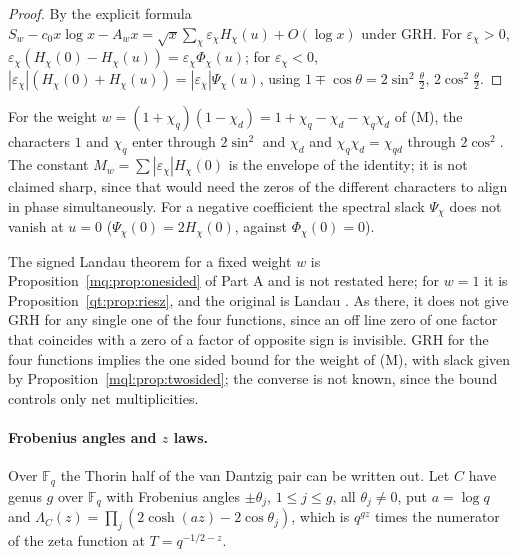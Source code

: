 \begin{proof}
By the explicit formula $S_w-c_0x\log x-A_wx=\sqrt x\sum_\chi \varepsilon_\chi H_\chi(u)+O(\log x)$ under GRH. For $\varepsilon_\chi>0$, $\varepsilon_\chi(H_\chi(0)-H_\chi(u))=\varepsilon_\chi\Phi_\chi(u)$; for $\varepsilon_\chi<0$, $|\varepsilon_\chi|(H_\chi(0)+H_\chi(u))=|\varepsilon_\chi|\Psi_\chi(u)$, using $1\mp\cos\theta=2\sin^2\frac\theta2,\,2\cos^2\frac\theta2$.
\end{proof}

For the weight $w=(1+\chi_q)(1-\chi_d)=1+\chi_q-\chi_d-\chi_q\chi_d$ of (M), the characters $1$ and $\chi_q$ enter through $2\sin^2$ and $\chi_d$ and $\chi_q\chi_d=\chi_{qd}$ through $2\cos^2$. The constant $M_w=\sum|\varepsilon_\chi|H_\chi(0)$ is the envelope of the identity; it is not claimed sharp, since that would need the zeros of the different characters to align in phase simultaneously. For a negative coefficient the spectral slack $\Psi_\chi$ does not vanish at $u=0$ ($\Psi_\chi(0)=2H_\chi(0)$, against $\Phi_\chi(0)=0$).

\begin{remark}\label{mql:rem:landau}
The signed Landau theorem for a fixed weight $w$ is Proposition~\ref{mq:prop:onesided} of Part A and is not restated here; for $w=1$ it is Proposition~\ref{qt:prop:riesz}, and the original is Landau \cite{Landau05}. As there, it does not give GRH for any single one of the four functions, since an off line zero of one factor that coincides with a zero of a factor of opposite sign is invisible. GRH for the four functions implies the one sided bound for the weight of (M), with slack given by Proposition~\ref{mql:prop:twosided}; the converse is not known, since the bound controls only net multiplicities.
\end{remark}

\paragraph{Frobenius angles and $z$ laws.} Over $\mathbb F_q$ the Thorin half of the van Dantzig pair can be written out. Let $C$ have genus $g$ over $\mathbb F_q$ with Frobenius angles $\pm\theta_j$, $1\le j\le g$, all $\theta_j\ne0$, put $a=\log q$ and $\Lambda_C(z)=\prod_j(2\cosh(az)-2\cos\theta_j)$, which is $q^{gz}$ times the numerator of the zeta function at $T=q^{-1/2-z}$.


